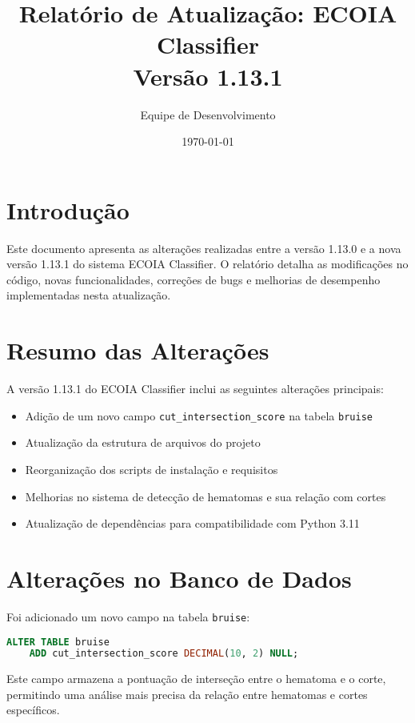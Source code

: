 \documentclass[12pt,a4paper]{article}
\title{Relatório de Atualização: ECOIA Classifier\\Versão 1.13.1}
\author{Equipe de Desenvolvimento}
\date{\today}
\begin{document}
\maketitle

\section{Introdução}

Este documento apresenta as alterações realizadas entre a versão 1.13.0 e a nova versão 1.13.1 do sistema ECOIA Classifier. O relatório detalha as modificações no código, novas funcionalidades, correções de bugs e melhorias de desempenho implementadas nesta atualização.

\section{Resumo das Alterações}

A versão 1.13.1 do ECOIA Classifier inclui as seguintes alterações principais:

\begin{itemize}
    \item Adição de um novo campo \texttt{cut\_intersection\_score} na tabela \texttt{bruise}
    \item Atualização da estrutura de arquivos do projeto
    \item Reorganização dos scripts de instalação e requisitos
    \item Melhorias no sistema de detecção de hematomas e sua relação com cortes
    \item Atualização de dependências para compatibilidade com Python 3.11
\end{itemize}

\section{Alterações no Banco de Dados}

Foi adicionado um novo campo na tabela \texttt{bruise}:

\begin{lstlisting}[language=SQL]
ALTER TABLE bruise
    ADD cut_intersection_score DECIMAL(10, 2) NULL;
\end{lstlisting}

Este campo armazena a pontuação de interseção entre o hematoma e o corte, permitindo uma análise mais precisa da relação entre hematomas e cortes específicos.
\end{document}
